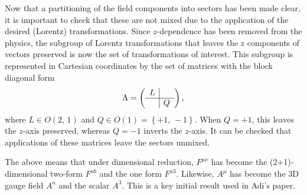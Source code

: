 \documentclass{article}
\begin{document}
\noindent Now that a partitioning of the field components into sectors has been made clear, it is important to check that these are not mixed due to the application of the desired (Lorentz) transformations. Since $z$-dependence has been removed from the physics, the subgroup of Lorentz transformations that leaves the z components of vectors preserved is now the set of transformations of interest. This subgroup is represented in Cartesian coordinates by the set of matrices with the block diagonal form
\begin{equation}
    \Lambda =  \begin{pmatrix}
        \begin{array}{c|c}
            L&\\ \hline
             & Q
        \end{array}
    \end{pmatrix},
\end{equation}
where $L\in O\left(2,\,1\right)$ and $Q\in O\left(1\right)=\left\{+1,\,-1\right\}$. When $Q=+1$, this leaves the $z$-axis preserved, whereas $Q=-1$ inverts the $z$-axis. It can be checked that applications of these matrices leave the sectors unmixed. \newline

\noindent The above means that under dimensional reduction, $F^{\mu\nu}$ has become the (2+1)-dimensional two-form $F^{ab}$ and the one form $F^{a3}$. Likewise, $A^{\mu}$ has become the 3D gauge field $A^{a}$ and the scalar $A^{3}$. This is a key initial result used in Adi's paper. \newline
\end{document}
